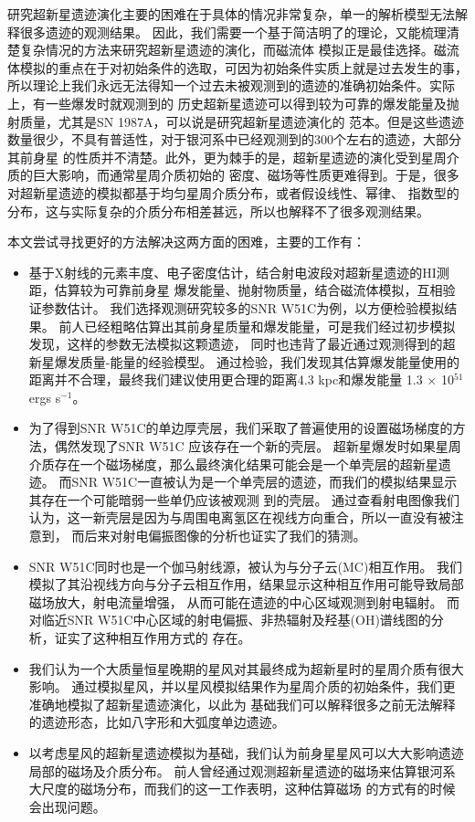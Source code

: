 研究超新星遗迹演化主要的困难在于具体的情况非常复杂，单一的解析模型无法解释很多遗迹的观测结果。
因此，我们需要一个基于简洁明了的理论，又能梳理清楚复杂情况的方法来研究超新星遗迹的演化，而磁流体
模拟正是最佳选择。磁流体模拟的重点在于对初始条件的选取，可因为初始条件实质上就是过去发生的事，
所以理论上我们永远无法得知一个过去未被观测到的遗迹的准确初始条件。实际上，有一些爆发时就观测到的
历史超新星遗迹可以得到较为可靠的爆发能量及抛射质量，尤其是SN 1987A，可以说是研究超新星遗迹演化的
范本。但是这些遗迹数量很少，不具有普适性，对于银河系中已经观测到的300个左右的遗迹，大部分其前身星
的性质并不清楚。此外，更为棘手的是，超新星遗迹的演化受到星周介质的巨大影响，而通常星周介质初始的
密度、磁场等性质更难得到。于是，很多对超新星遗迹的模拟都基于均匀星周介质分布，或者假设线性、幂律、
指数型的分布，这与实际复杂的介质分布相差甚远，所以也解释不了很多观测结果。

本文尝试寻找更好的方法解决这两方面的困难，主要的工作有：
\begin{itemize}
  \item 基于X射线的元素丰度、电子密度估计，结合射电波段对超新星遗迹的HI测距，估算较为可靠前身星
  爆发能量、抛射物质量，结合磁流体模拟，互相验证参数估计。
  我们选择观测研究较多的SNR W51C为例，以方便检验模拟结果。
  前人已经粗略估算出其前身星质量和爆发能量，可是我们经过初步模拟发现，这样的参数无法模拟这颗遗迹，
  同时也违背了最近通过观测得到的超新星爆发质量-能量的经验模型。
  通过检验，我们发现其估算爆发能量使用的距离并不合理，最终我们建议使用更合理的距离4.3 kpc和爆发能量
  1.3 $\times$ 10$^{51}$ ergs s$^{-1}$。

  \item 为了得到SNR W51C的单边厚壳层，我们采取了普遍使用的设置磁场梯度的方法，偶然发现了SNR W51C
  应该存在一个新的壳层。
  超新星爆发时如果星周介质存在一个磁场梯度，那么最终演化结果可能会是一个单壳层的超新星遗迹。
  而SNR W51C一直被认为是一个单壳层的遗迹，而我们的模拟结果显示其存在一个可能暗弱一些单仍应该被观测
  到的壳层。
  通过查看射电图像我们认为，这一新壳层是因为与周围电离氢区在视线方向重合，所以一直没有被注意到，
  而后来对射电偏振图像的分析也证实了我们的猜测。

  \item SNR W51C同时也是一个伽马射线源，被认为与分子云(MC)相互作用。
  我们模拟了其沿视线方向与分子云相互作用，结果显示这种相互作用可能导致局部磁场放大，射电流量增强，
  从而可能在遗迹的中心区域观测到射电辐射。
  而对临近SNR W51C中心区域的射电偏振、非热辐射及羟基(OH)谱线图的分析，证实了这种相互作用方式的
  存在。

  \item 我们认为一个大质量恒星晚期的星风对其最终成为超新星时的星周介质有很大影响。
  通过模拟星风，并以星风模拟结果作为星周介质的初始条件，我们更准确地模拟了超新星遗迹演化，以此为
  基础我们可以解释很多之前无法解释的遗迹形态，比如八字形和大弧度单边遗迹。

  \item 以考虑星风的超新星遗迹模拟为基础，我们认为前身星星风可以大大影响遗迹局部的磁场及介质分布。
  前人曾经通过观测超新星遗迹的磁场来估算银河系大尺度的磁场分布，而我们的这一工作表明，这种估算磁场
  的方式有的时候会出现问题。
\end{itemize}

